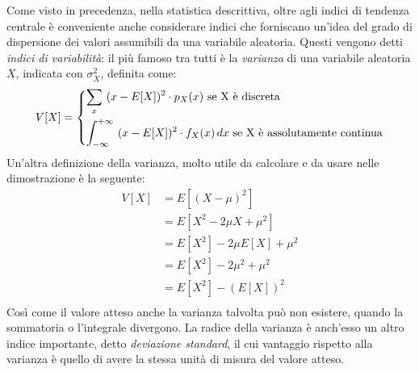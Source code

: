 \documentclass[a4paper,12pt, oneside]{book}
\begin{document}
Come visto in precedenza, nella statistica descrittiva, oltre agli indici di tendenza centrale è conveniente 
anche considerare indici che forniscano un'idea del grado di dispersione dei valori 
assumibili da una variabile aleatoria.\newline
Questi vengono detti \emph{indici di variabilità}: il più famoso tra tutti è la \emph{varianza}
di una variabile aleatoria $X$, indicata con $\sigma_X ^ 2$, definita come:
\[V[X] = \begin{dcases}
            \sum_{x}\,\, (x - E[X])^2 \cdot p_X(x)\mbox{ se X è discreta}\\
            \int_{-\infty}^{+\infty}\,\, (x - E[X])^2 \cdot f_X(x)\,dx\mbox{ se X è assolutamente continua}\\
         \end{dcases}\]
Un'altra definizione della varianza, molto utile da calcolare e da usare nelle dimostrazione è la seguente:
\[ \begin{split}
    V[X] & = E[(X - \mu)^2] \\
         & = E[X^2 - 2\mu X + \mu ^2] \\
         & = E[X^2] - 2\mu E[X] + \mu ^2\\
         & = E[X^2] - 2\mu ^2 + \mu ^2 \\
         & = E[X^2] - (E[X])^2\\
    \end{split} \]
Così come il valore atteso anche la varianza talvolta può non esistere, quando la sommatoria o l'integrale divergono.\newline
La radice della varianza è anch'esso un altro indice importante, detto \emph{deviazione standard}, il cui
vantaggio rispetto alla varianza è quello di avere la stessa unità di misura del valore atteso.
\end{document}
